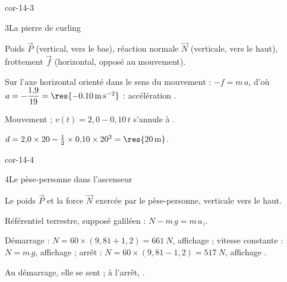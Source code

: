 \begin{blocLivre}{cor-14-3}
\begin{corrige}{3}{La pierre de curling}
\begin{questions}
\item Poids $\vec{P}$ (vertical, vers le bas), réaction normale $\vec{N}$ (verticale, vers le haut), frottement $\vec{f}$
(horizontal, opposé au mouvement).
\item Sur l'axe horizontal orienté dans le sens du mouvement : $-f=m\,a$, d'où
$a=-\dfrac{1{,}9}{19}=\res{\qty{-0,10}{m.s^{-2}}}$ : accélération .
\item Mouvement  ; $v(t)=2{,}0-0{,}10\,t$ s'annule à .
\item $d=2{,}0\times20-\frac12\times0{,}10\times20^2=\res{\qty{20}{m}}$.
\end{questions}
\end{corrige}
\end{blocLivre}
\begin{blocLivre}{cor-14-4}
\begin{corrige}{4}{Le pèse-personne dans l'ascenseur}
\begin{questions}
\item Le poids $\vec{P}$ et la force $\vec{N}$ exercée par le pèse-personne, verticale vers le haut.
\item Référentiel terrestre, supposé galiléen : $N-m\,g=m\,a_z$.
\item Démarrage : $N=60\times(9{,}81+1{,}2)=\qty{661}{N}$, affichage  ; vitesse constante : $N=m\,g$,
affichage  ; arrêt : $N=60\times(9{,}81-1{,}2)=\qty{517}{N}$, affichage .
\item Au démarrage, elle se sent  ; à l'arrêt, .
\end{questions}
\end{corrige}
\end{blocLivre}
